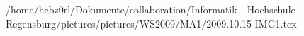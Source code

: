 /home/hebz0rl/Dokumente/collaboration/Informatik---Hochschule-Regensburg/pictures/pictures/WS2009/MA1/2009.10.15-IMG1.tex